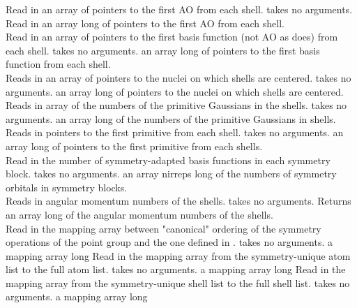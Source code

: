 {Read in an array of pointers to the first AO
from each shell.}
{takes no arguments.}
{Read in an array  long of pointers to
the first AO from each shell.} \\
{Read in an array of pointers to the first basis
function (not AO as  does)
from each shell.}
{takes no arguments.}
{an array  long of pointers to
the first basis function from each shell.} \\
{Reads in an array of pointers to the nuclei on which shells are centered.}
{takes no arguments.}
{an array  long of pointers to the nuclei on which shells
are centered.}
{Reads in array of the numbers of the primitive
Gaussians in the shells.}
{takes no arguments.}
{an array  long of the numbers of 
the primitive Gaussians in shells.} \\
{Reads in pointers to the first primitive
from each shell.}
{takes no arguments.}
{an array  long of pointers to the first 
primitive from each shells.} \\
{Read in the number of symmetry-adapted basis functions in each symmetry block.}
{takes no arguments.}
{an array nirreps long of the numbers of
symmetry orbitals in symmetry blocks.} \\
{Reads in angular momentum numbers of
the shells.}
{takes no arguments.}
{Returns an array  long of
the angular momentum numbers of the shells.} \\
{Read in the mapping array between "canonical" ordering
of the symmetry operations of the point group and the
one defined in .}
{takes no arguments.}
{a mapping array  long}
{Read in the mapping array from the symmetry-unique atom 
list to the full atom list.}
{takes no arguments.}
{a mapping array  long}
{Read in the mapping array from the symmetry-unique shell list
to the full shell list.}
{takes no arguments.}
{a mapping array  long}

